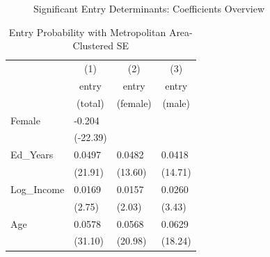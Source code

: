 
\begin{figure}
    \caption{Significant Entry Determinants: Coefficients Overview}
    \label{fig:awesome_image}
\end{figure}


\tablespacing
\small
\begin{longtable}{p{3 cm} p{2.25 cm} p{2.25 cm} p{2.25 cm}}
\caption{Entry Probability with Metropolitan Area-Clustered SE}
\centering
\hline\hline
            &\multicolumn{1}{c}{(1)}&\multicolumn{1}{c}{(2)}&\multicolumn{1}{c}{(3)}\\
            &\multicolumn{1}{c}{entry}&\multicolumn{1}{c}{entry}&\multicolumn{1}{c}{entry}\\
            &\multicolumn{1}{c}{(total)}&\multicolumn{1}{c}{(female)}&\multicolumn{1}{c}{(male)}\\
\hline
Female      &      -0.204\sym{***}&                     &                     \\
            &    (-22.39)         &                     &                     \\
Ed\_Years    &      0.0497\sym{***}&      0.0482\sym{***}&      0.0418\sym{***}\\
            &     (21.91)         &     (13.60)         &     (14.71)         \\

Log\_Income  &      0.0169\sym{**} &      0.0157\sym{*}  &      0.0260\sym{***}\\
            &      (2.75)         &      (2.03)         &      (3.43)         \\

Age         &      0.0578\sym{***}&      0.0568\sym{***}&      0.0629\sym{***}\\
            &     (31.10)         &     (20.98)         &     (18.24)         \\


\end{longtable}
